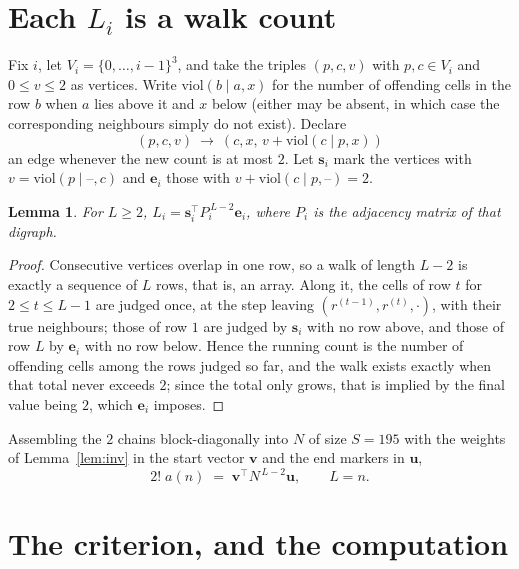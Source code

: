 \documentclass[11pt,a4paper]{article}
\theoremstyle{plain}
\newtheorem{lemma}[theorem]{Lemma}
\theoremstyle{definition}
\begin{document}
\section{Each $L_i$ is a walk count}

Fix $i$, let $V_i=\{0,\dots,i-1\}^{3}$, and take the triples $(p,c,v)$ with
$p,c\in V_i$ and $0\le v\le2$ as vertices. Write $\mathrm{viol}(b\mid a,x)$ for the number
of offending cells in the row $b$ when $a$ lies above it and $x$ below (either may be
absent, in which case the corresponding neighbours simply do not exist). Declare
\[
(p,c,v)\ \longrightarrow\ (c,x,\,v+\mathrm{viol}(c\mid p,x))
\]
an edge whenever the new count is at most $2$. Let $\mathbf{s}_i$ mark the vertices with
$v=\mathrm{viol}(p\mid\text{--},c)$ and $\mathbf{e}_i$ those with
$v+\mathrm{viol}(c\mid p,\text{--})=2$.

\begin{lemma}\label{lem:walk}
For $L\ge2$, $L_i=\mathbf{s}_i^{\!\top}P_i^{\,L-2}\mathbf{e}_i$, where $P_i$ is the
adjacency matrix of that digraph.
\end{lemma}

\begin{proof}
Consecutive vertices overlap in one row, so a walk of length $L-2$ is exactly a sequence
of $L$ rows, that is, an array. Along it, the cells of row $t$ for $2\le t\le L-1$ are
judged once, at the step leaving $(r^{(t-1)},r^{(t)},\cdot)$, with their true neighbours;
those of row $1$ are judged by $\mathbf{s}_i$ with no row above, and those of row
$L$ by $\mathbf{e}_i$ with no row below. Hence the running count is the number of
offending cells among the rows judged so far, and the walk exists exactly when that total
never exceeds $2$; since the total only grows, that is implied by the final value being
$2$, which $\mathbf{e}_i$ imposes.
\end{proof}

Assembling the $2$ chains block-diagonally into $N$ of size $S=195$ with the weights of
Lemma~\ref{lem:inv} in the start vector $\mathbf{v}$ and the end markers in
$\mathbf{u}$,
\begin{equation}\label{eq:walk2}
2!\;a(n)\;=\;\mathbf{v}^{\!\top}N^{\,L-2}\mathbf{u},\qquad L=n .
\end{equation}

\section{The criterion, and the computation}
\end{document}
